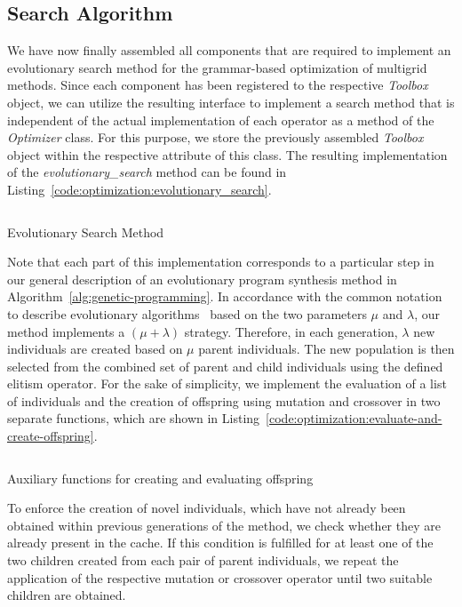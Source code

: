 \subsection{Search Algorithm}
\label{sec:evostencils-part1:search-algorithm}
We have now finally assembled all components that are required to implement an evolutionary search method for the grammar-based optimization of multigrid methods.
Since each component has been registered to the respective \emph{Toolbox} object, we can utilize the resulting interface to implement a search method that is independent of the actual implementation of each operator as a method of the \emph{Optimizer} class. 
For this purpose, we store the previously assembled \emph{Toolbox} object within the respective attribute of this class.
The resulting implementation of the \emph{evolutionary\_search} method can be found in Listing~\ref{code:optimization:evolutionary_search}. 
\begin{listing}
	\inputminted[linenos]{python}{evostencils/optimization/evolutionary_search.py}
	\caption{Evolutionary Search Method}
	\label{code:optimization:evolutionary_search}
\end{listing}
Note that each part of this implementation corresponds to a particular step in our general description of an evolutionary program synthesis method in Algorithm~\ref{alg:genetic-programming}.
In accordance with the common notation to describe evolutionary algorithms~\cite{back1997handbook} based on the two parameters $\mu$ and $\lambda$, our method implements a $\left(\mu + \lambda \right)$ strategy.
Therefore, in each generation, $\lambda$ new individuals are created based on $\mu$ parent individuals.
The new population is then selected from the combined set of parent and child individuals using the defined elitism operator.
For the sake of simplicity, we implement the evaluation of a list of individuals and the creation of offspring using mutation and crossover in two separate functions, which are shown in Listing~\ref{code:optimization:evaluate-and-create-offspring}.
\begin{listing}
	\inputminted{python}{evostencils/optimization/evolutionary_search_helper.py}
	\caption{Auxiliary functions for creating and evaluating offspring}
	\label{code:optimization:evaluate-and-create-offspring}
\end{listing}
To enforce the creation of novel individuals, which have not already been obtained within previous generations of the method, we check whether they are already present in the cache.
If this condition is fulfilled for at least one of the two children created from each pair of parent individuals, we repeat the application of the respective mutation or crossover operator until two suitable children are obtained.
